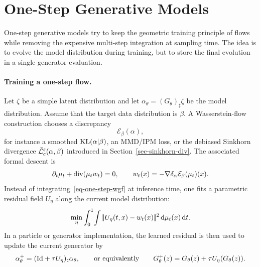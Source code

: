 
\section{One-Step Generative Models}

One-step generative models try to keep the geometric training principle of flows while removing the expensive multi-step integration at sampling time. The idea is to evolve the model distribution during training, but to store the final evolution in a single generator evaluation.

\paragraph{Training a one-step flow.}

Let $\zeta$ be a simple latent distribution and let $\alpha_\theta=(G_\theta)_\sharp\zeta$ be the model distribution. Assume that the target data distribution is $\beta$. A Wasserstein-flow construction chooses a discrepancy
\[
	\mathcal E_\beta(\alpha),
\]
for instance a smoothed $\operatorname{KL}(\alpha|\beta)$, an MMD/IPM loss, or the debiased Sinkhorn divergence $\bar{\mathcal{L}}_c^\varepsilon(\alpha,\beta)$ introduced in Section~\ref{sec-sinkhorn-div}. The associated formal descent is
\begin{equation}\label{eq-one-step-wgf}
	\partial_t\mu_t+\operatorname{div}(\mu_t w_t)=0,
	\qquad
	w_t(x)=-\nabla\delta_\alpha \mathcal E_\beta(\mu_t)(x).
\end{equation}
Instead of integrating~\eqref{eq-one-step-wgf} at inference time, one fits a parametric residual field $U_\eta$ along the current model distribution:
\begin{equation}\label{eq-one-step-l2-fit}
	\min_\eta \int_0^1\!\int
		|\!| U_\eta(t,x)-w_t(x) |\!|^2
		\,\mathrm{d}\mu_t(x)\,\mathrm{d} t.
\end{equation}
In a particle or generator implementation, the learned residual is then used to update the current generator by
\[
	\alpha_{\theta}^{+}
	=
	(\mathrm{Id}+\tau U_\eta)_\sharp \alpha_\theta,
	\qquad\text{or equivalently}\qquad
	G_\theta^{+}(z)=G_\theta(z)+\tau U_\eta(G_\theta(z)).
\]

